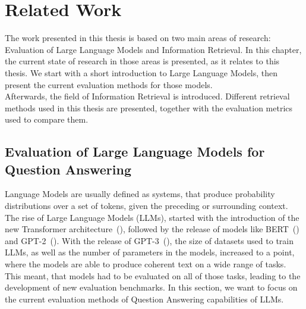 \chapter{Related Work}\label{related-work}
The work presented in this thesis is based on two main areas of research: Evaluation of Large Language Models and Information Retrieval.
In this chapter, the current state of research in those areas is presented, as it relates to this thesis.
We start with a short introduction to Large Language Models, then present the current evaluation methods for those models.
\\
Afterwards, the field of Information Retrieval is introduced.
Different retrieval methods used in this thesis are presented, together with the evaluation metrics used to compare them.

\section{Evaluation of Large Language Models for Question Answering}\label{sec:evaluation-of-large-language-models}
Language Models are usually defined as systems, that produce probability distributions over a set of tokens, given the preceding or surrounding context.
The rise of Large Language Models (LLMs), started with the introduction of the new Transformer architecture~(\cite{vaswani:2017}), followed by the release of models like BERT~(\cite{devlin:2018}) and GPT-2~(\cite{radford:2018}).
With the release of GPT-3~(\cite{brown:2020}), the size of datasets used to train LLMs, as well as the number of parameters in the models, increased to a point, where the models are able to produce coherent text on a wide range of tasks.
This meant, that models had to be evaluated on all of those tasks, leading to the development of new evaluation benchmarks.
In this section, we want to focus on the current evaluation methods of Question Answering capabilities of LLMs.


